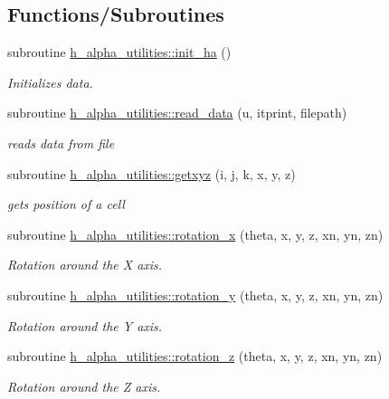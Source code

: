 \subsection*{Functions/\+Subroutines}
\begin{DoxyCompactItemize}
\item 
subroutine \hyperlink{namespaceh__alpha__utilities_a8bb4ef22ad133f8d3f75cf1a26e14035}{h\+\_\+alpha\+\_\+utilities\+::init\+\_\+ha} ()
\begin{DoxyCompactList}\small\item\em Initializes data. \end{DoxyCompactList}\item 
subroutine \hyperlink{namespaceh__alpha__utilities_a5549bf9fd812d02d9189d27f380c01c0}{h\+\_\+alpha\+\_\+utilities\+::read\+\_\+data} (u, itprint, filepath)
\begin{DoxyCompactList}\small\item\em reads data from file \end{DoxyCompactList}\item 
subroutine \hyperlink{namespaceh__alpha__utilities_af48cd3c223c292170bc1f90da256f537}{h\+\_\+alpha\+\_\+utilities\+::getxyz} (i, j, k, x, y, z)
\begin{DoxyCompactList}\small\item\em gets position of a cell \end{DoxyCompactList}\item 
subroutine \hyperlink{namespaceh__alpha__utilities_a65ad5d15c1265e31f4d191ebf771e669}{h\+\_\+alpha\+\_\+utilities\+::rotation\+\_\+x} (theta, x, y, z, xn, yn, zn)
\begin{DoxyCompactList}\small\item\em Rotation around the X axis. \end{DoxyCompactList}\item 
subroutine \hyperlink{namespaceh__alpha__utilities_ab643f1bac838912c58b25923b5de40ca}{h\+\_\+alpha\+\_\+utilities\+::rotation\+\_\+y} (theta, x, y, z, xn, yn, zn)
\begin{DoxyCompactList}\small\item\em Rotation around the Y axis. \end{DoxyCompactList}\item 
subroutine \hyperlink{namespaceh__alpha__utilities_acaf25f2c0ad80c5d7e2f451f58522a49}{h\+\_\+alpha\+\_\+utilities\+::rotation\+\_\+z} (theta, x, y, z, xn, yn, zn)
\begin{DoxyCompactList}\small\item\em Rotation around the Z axis. \end{DoxyCompactList}\item 

\end{DoxyCompactItemize}
